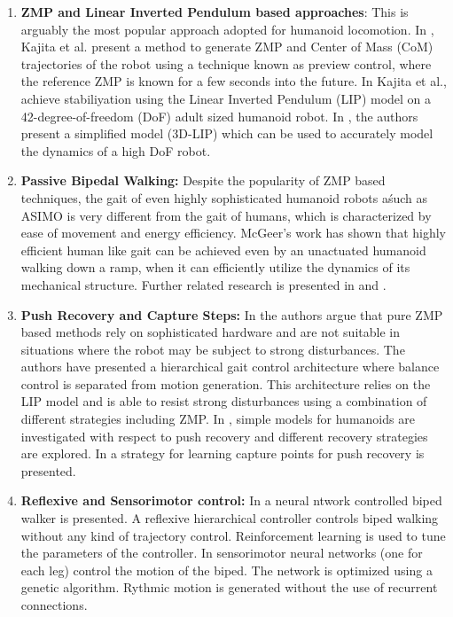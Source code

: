 \documentclass[12pt,twoside]{article}
\theoremstyle{plain}
\theoremstyle{definition}
\theoremstyle{remark}
\begin{document}
\begin{enumerate}
\item \textbf{ZMP and Linear Inverted Pendulum based approaches}: This is arguably the most popular approach adopted for humanoid locomotion. In \cite{kajita2003biped}, Kajita et al. present a method to generate ZMP and Center of Mass (CoM) trajectories of the robot using a technique known as preview control, where the reference ZMP is known for a few seconds into the future. In \cite{kajita2010biped} Kajita et al., achieve stabiliyation using the Linear Inverted Pendulum (LIP) model on a 42-degree-of-freedom (DoF) adult sized humanoid robot. In \cite{kajita20013d}, the authors present a simplified model (3D-LIP) which can be used to accurately model the dynamics of a high DoF robot.
\item \textbf{Passive Bipedal Walking:} Despite the popularity of ZMP based techniques, the gait of even highly sophisticated humanoid robots aśuch as ASIMO is very different from the gait of humans, which is characterized by ease of movement and energy efficiency. McGeer's work \cite{mcgeer1990passive} has shown that highly efficient human like gait can be achieved even by an unactuated humanoid walking down a ramp, when it can efficiently utilize the dynamics of its mechanical structure. Further related research is presented in \cite{kuo1999stabilization} and \cite{collins2005efficient}.
\item \textbf{Push Recovery and Capture Steps: } In \cite{missura2013omnidirectional, missura2014online, missura2015gradient} the authors argue that pure ZMP based methods rely on sophisticated hardware and are not suitable in situations where the robot may be subject to strong disturbances. The authors have presented a hierarchical gait control architecture where balance control is separated from motion generation. This architecture relies on the LIP model and is able to resist strong disturbances using a combination of different strategies including ZMP. In \cite{stephens2007humanoid}, simple models for humanoids are investigated with respect to push recovery and different recovery strategies are explored. In \cite{rebula2007learning} a strategy for learning capture points for push recovery is presented.
\item \textbf{Reflexive and Sensorimotor control: } In \cite{geng2005fast} a neural ntwork controlled biped walker is presented. A reflexive hierarchical controller controls biped walking without any kind of trajectory control. Reinforcement learning is used to tune the parameters of the controller. In \cite{paul2005sensorimotor} sensorimotor neural networks (one for each leg) control the motion of the biped. The network is optimized using a genetic algorithm. Rythmic motion is generated without the use of recurrent connections.

\end{enumerate}
\end{document}
